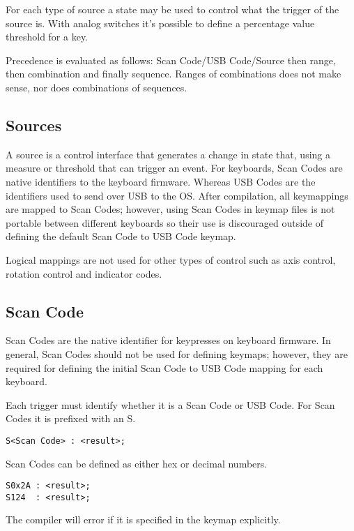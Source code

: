 \documentclass{kiibohd-template}
\begin{document}
For each type of source a state may be used to control what the trigger of the source is.
With analog switches it's possible to define a percentage value threshold for a key.

Precedence is evaluated as follows: Scan Code/USB Code/Source then range, then combination and finally sequence.
Ranges of combinations does not make sense, nor does combinations of sequences.


\subsection{Sources}

A source is a control interface that generates a change in state that, using a measure or threshold that can trigger an event.
For keyboards, Scan Codes are native identifiers to the keyboard firmware.
Whereas USB Codes are the identifiers used to send over USB to the OS.
After compilation, all keymappings are mapped to Scan Codes; however, using Scan Codes in keymap files is not portable between different keyboards so their use is discouraged outside of defining the default Scan Code to USB Code keymap.

Logical mappings are not used for other types of control such as axis control, rotation control and indicator codes.


\subsection{Scan Code}
\label{subsec:Scan_Code}

Scan Codes are the native identifier for keypresses on keyboard firmware.
In general, Scan Codes should not be used for defining keymaps; however, they are required for defining the initial Scan Code to USB Code mapping for each keyboard.

Each trigger must identify whether it is a Scan Code or USB Code.
For Scan Codes it is prefixed with an S.

\begin{lstlisting}
S<Scan Code> : <result>;
\end{lstlisting}

Scan Codes can be defined as either hex or decimal numbers.

\begin{lstlisting}
S0x2A : <result>;
S124  : <result>;
\end{lstlisting}

The compiler will error if it is specified in the keymap explicitly.
\end{document}
